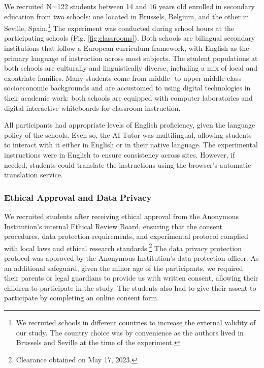 \documentclass[
  12pt,
]{article}
\begin{document}
We recruited N=122 students between 14 and 16 years old enrolled in secondary education from two schools: one located in Brussels, Belgium, and the other in Seville, Spain.\footnote{We recruited schools in different countries to increase the external validity of our study. The country choice was by convenience as the authors lived in Brussels and Seville at the time of the experiment.} The experiment was conducted during school hours at the participating schools (Fig. \ref{fig:classrooms}). Both schools are bilingual secondary institutions that follow a European curriculum framework, with English as the primary language of instruction across most subjects. The student populations at both schools are culturally and linguistically diverse, including a mix of local and expatriate families. Many students come from middle- to upper-middle-class socioeconomic backgrounds and are accustomed to using digital technologies in their academic work: both schools are equipped with computer laboratories and digital interactive whiteboards for classroom instruction.

All participants had appropriate levels of English proficiency, given the language policy of the schools. Even so, the AI Tutor was multilingual, allowing students to interact with it either in English or in their native language. The experimental instructions were in English to ensure consistency across sites. However, if needed, students could translate the instructions using the browser's automatic translation service.

\subsubsection{Ethical Approval and Data Privacy}\label{ethical-approval-and-data-privacy}

We recruited students after receiving ethical approval from the Anonymous Institution's internal Ethical Review Board, ensuring that the consent procedures, data protection requirements, and experimental protocol complied with local laws and ethical research standards.\footnote{Clearance obtained on May 17, 2023.} The data privacy protection protocol was approved by the Anonymous Institution's data protection officer. As an additional safeguard, given the minor age of the participants, we required their parents or legal guardians to provide us with written consent, allowing their children to participate in the study. The students also had to give their assent to participate by completing an online consent form.
\end{document}
